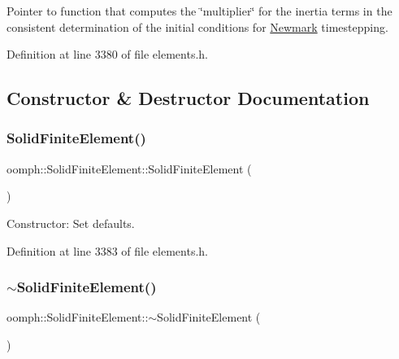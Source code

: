 Pointer to function that computes the \char`\"{}multiplier\char`\"{} for the inertia terms in the consistent determination of the initial conditions for \hyperlink{classoomph_1_1Newmark}{Newmark} timestepping. 



Definition at line 3380 of file elements.\+h.



\subsection{Constructor \& Destructor Documentation}
\mbox{\label{classoomph_1_1SolidFiniteElement_aa66c3834f1bf99bb821453a2bfbb55c9}} 
\subsubsection{\texorpdfstring{Solid\+Finite\+Element()}{SolidFiniteElement()}\hspace{0.1cm}{\footnotesize\ttfamily [1/2]}}
{\footnotesize\ttfamily oomph\+::\+Solid\+Finite\+Element\+::\+Solid\+Finite\+Element (\begin{DoxyParamCaption}{ }\end{DoxyParamCaption})\hspace{0.3cm}{\ttfamily [inline]}}



Constructor\+: Set defaults. 



Definition at line 3383 of file elements.\+h.

\mbox{\label{classoomph_1_1SolidFiniteElement_adc8527ae26aba090bed52da41f41b57f}} 
\subsubsection{\texorpdfstring{$\sim$\+Solid\+Finite\+Element()}{~SolidFiniteElement()}}
{\footnotesize\ttfamily oomph\+::\+Solid\+Finite\+Element\+::$\sim$\+Solid\+Finite\+Element (\begin{DoxyParamCaption}{ }\end{DoxyParamCaption})\hspace{0.3cm}{\ttfamily [virtual]}}



